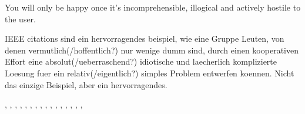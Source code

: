 \documentclass[a4paper,11pt]{article}
\begin{document}
You  will only  be happy  once it's  incomprehensible, illogical  and actively
hostile to the user.

IEEE  citations sind  ein  hervorragendes beispiel,  wie  eine Gruppe  Leuten,
von  denen  vermutlich(/hoffentlich?)  nur   wenige  dumm  sind,  durch  einen
kooperativen Effort  eine absolut(/ueberraschend?) idiotische  und laecherlich
komplizierte Loesung fuer ein  relativ(/eigentlich?) simples Problem entwerfen
koennen. Nicht das einzige Beispiel, aber ein hervorragendes.

\cite{fancy-article},
\cite{funny-book},
\cite{funny-inbook},
\cite{funny-incollection},
\cite{serious-booklet},
\cite{useless-manual},
\cite{boring-conference},
\cite{acceptable-proceedings},
\cite{splendid-mastersthesis},
\cite{splendid-phdthesis},
\cite{innovative-report},
\cite{elec-resource},
\cite{patent},
\cite{periodical},
\cite{the-standard},
\cite{misc-things},


\end{document}
